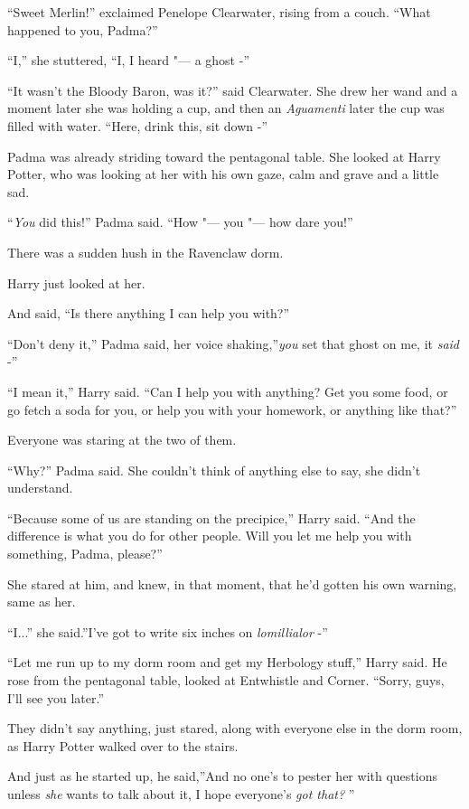 ``Sweet Merlin!'' exclaimed Penelope Clearwater, rising from a couch.
``What happened to you, Padma?''

``I,'' she stuttered, ``I, I heard "--- a ghost -''

``It wasn't the Bloody Baron, was it?'' said Clearwater. She drew her
wand and a moment later she was holding a cup, and then an
\emph{Aguamenti} later the cup was filled with water. ``Here, drink
this, sit down -''

Padma was already striding toward the pentagonal table. She looked at
Harry Potter, who was looking at her with his own gaze, calm and grave
and a little sad.

``\emph{You} did this!'' Padma said. ``How "--- you "--- how dare you!''

There was a sudden hush in the Ravenclaw dorm.

Harry just looked at her.

And said, ``Is there anything I can help you with?''

``Don't deny it,'' Padma said, her voice shaking,''\emph{you} set that
ghost on me, it \emph{said} -''

``I mean it,'' Harry said. ``Can I help you with anything? Get you some
food, or go fetch a soda for you, or help you with your homework, or
anything like that?''

Everyone was staring at the two of them.

``Why?'' Padma said. She couldn't think of anything else to say, she
didn't understand.

``Because some of us are standing on the precipice,'' Harry said. ``And
the difference is what you do for other people. Will you let me help you
with something, Padma, please?''

She stared at him, and knew, in that moment, that he'd gotten his own
warning, same as her.

``I...'' she said.''I've got to write six inches on
\emph{lomillialor} -''

``Let me run up to my dorm room and get my Herbology stuff,'' Harry
said. He rose from the pentagonal table, looked at Entwhistle and
Corner. ``Sorry, guys, I'll see you later.''

They didn't say anything, just stared, along with everyone else in the
dorm room, as Harry Potter walked over to the stairs.

And just as he started up, he said,''And no one's to pester her with
questions unless \emph{she} wants to talk about it, I hope everyone's
\emph{got that?} ''


